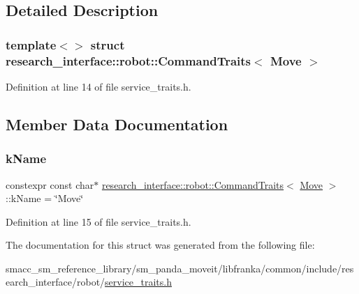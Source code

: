\subsection{Detailed Description}
\subsubsection*{template$<$$>$\newline
struct research\+\_\+interface\+::robot\+::\+Command\+Traits$<$ Move $>$}



Definition at line 14 of file service\+\_\+traits.\+h.



\subsection{Member Data Documentation}
\mbox{\label{structresearch__interface_1_1robot_1_1CommandTraits_3_01Move_01_4_a8b66b8b529248114f90cb5350e06b0e7}} 
\subsubsection{\texorpdfstring{k\+Name}{kName}}
{\footnotesize\ttfamily constexpr const char$\ast$ \hyperlink{structresearch__interface_1_1robot_1_1CommandTraits}{research\+\_\+interface\+::robot\+::\+Command\+Traits}$<$ \hyperlink{structresearch__interface_1_1robot_1_1Move}{Move} $>$\+::k\+Name = \char`\"{}Move\char`\"{}\hspace{0.3cm}{\ttfamily [static]}}



Definition at line 15 of file service\+\_\+traits.\+h.



The documentation for this struct was generated from the following file\+:\begin{DoxyCompactItemize}
\item 
smacc\+\_\+sm\+\_\+reference\+\_\+library/sm\+\_\+panda\+\_\+moveit/libfranka/common/include/research\+\_\+interface/robot/\hyperlink{service__traits_8h}{service\+\_\+traits.\+h}\end{DoxyCompactItemize}
